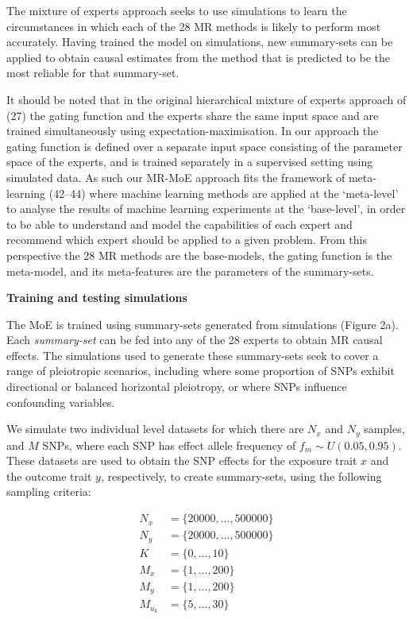 \documentclass[]{article}
\begin{document}
The mixture of experts approach seeks to use simulations to learn the
circumstances in which each of the 28 MR methods is likely to perform
most accurately. Having trained the model on simulations, new
summary-sets can be applied to obtain causal estimates from the method
that is predicted to be the most reliable for that summary-set.

It should be noted that in the original hierarchical mixture of experts
approach of (27) the gating function and the experts share the same
input space and are trained simultaneously using
expectation-maximisation. In our approach the gating function is defined
over a separate input space consisting of the parameter space of the
experts, and is trained separately in a supervised setting using
simulated data. As such our MR-MoE approach fits the framework of
meta-learning (42--44) where machine learning methods are applied at the
`meta-level' to analyse the results of machine learning experiments at
the `base-level', in order to be able to understand and model the
capabilities of each expert and recommend which expert should be applied
to a given problem. From this perspective the 28 MR methods are the
base-models, the gating function is the meta-model, and its
meta-features are the parameters of the summary-sets.

\textbf{Training and testing simulations}

The MoE is trained using summary-sets generated from simulations (Figure
2a). Each \emph{summary-set} can be fed into any of the 28 experts to
obtain MR causal effects. The simulations used to generate these
summary-sets seek to cover a range of pleiotropic scenarios, including
where some proportion of SNPs exhibit directional or balanced horizontal
pleiotropy, or where SNPs influence confounding variables.

We simulate two individual level datasets for which there are \(N_x\)
and \(N_y\) samples, and \(M\) SNPs, where each SNP has effect allele
frequency of \(f_m \sim U(0.05, 0.95)\). These datasets are used to
obtain the SNP effects for the exposure trait \(x\) and the outcome
trait \(y\), respectively, to create summary-sets, using the following
sampling criteria:

\[
\begin{aligned}
N_x & = \{20000, ..., 500000\} \\
N_y & = \{20000, ..., 500000\} \\
K & = \{0, ..., 10\} \\
M_x & = \{1, ..., 200\} \\
M_y & = \{1, ..., 200\} \\
M_{u_k} & = \{5,..., 30\} \\
\end{aligned}
\]
\end{document}

